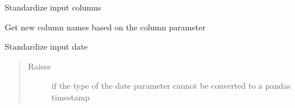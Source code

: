 \documentclass[letterpaper,10pt,english]{sphinxmanual}
\begin{document}

\begin{fulllineitems}
\label{\detokenize{dalio.util:dalio.util.process_cols}}
Standardize input columns

\end{fulllineitems}


\begin{fulllineitems}
\label{\detokenize{dalio.util:dalio.util.process_new_colnames}}
Get new column names based on the column parameter

\end{fulllineitems}


\begin{fulllineitems}
\label{\detokenize{dalio.util:dalio.util.process_date}}
Standardize input date
\begin{quote}\begin{description}
\item[{Raises}] \leavevmode
{} \textendash{} if the type of the date parameter cannot be converted to
    a pandas timestamp

\end{description}\end{quote}

\end{fulllineitems}

\end{document}
